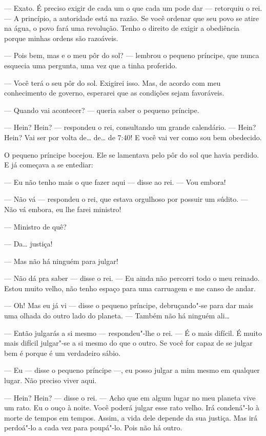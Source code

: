 \begin{Parallel}[p]{}{}
{--- Exato. É preciso exigir de cada um o que cada um pode dar --- retorquiu
o rei. --- A princípio, a autoridade está na razão. Se você ordenar que
seu povo se atire na água, o povo fará uma revolução. Tenho o direito de
exigir a obediência porque minhas ordens são razoáveis.

--- Pois bem, mas e o meu pôr do sol? --- lembrou o pequeno príncipe, que
nunca esquecia uma pergunta, uma vez que a tinha proferido.

--- Você terá o seu pôr do sol. Exigirei isso. Mas, de acordo com meu
conhecimento de governo, esperarei que as condições sejam favoráveis.

--- Quando vai acontecer? --- queria saber o pequeno príncipe.

--- Hein? Hein? --- respondeu o rei, consultando um grande calendário. ---
Hein? Hein? Vai ser por volta de\ldots{} de\ldots{} de 7:40! E você vai ver como
sou bem obedecido.

O pequeno príncipe bocejou. Ele se lamentava pelo pôr do sol que havia
perdido. E já começava a se entediar:

--- Eu não tenho mais o que fazer aqui --- disse ao rei. --- Vou embora!

--- Não vá --- respondeu o rei, que estava orgulhoso por possuir um súdito.
--- Não vá embora, eu lhe farei ministro!

--- Ministro de quê?

--- Da\ldots{} justiça!

--- Mas não há ninguém para julgar!

--- Não dá pra saber --- disse o rei. --- Eu ainda não percorri todo o meu
reinado. Estou muito velho, não tenho espaço para uma carruagem e me
canso de andar.

--- Oh! Mas eu já vi --- disse o pequeno príncipe, debruçando"-se para dar
mais uma olhada do outro lado do planeta. --- Também não há ninguém
ali\ldots{}

--- Então julgarás a si mesmo --- respondeu"-lhe o rei. --- É o mais difícil.
É muito mais difícil julgar"-se a si mesmo do que o outro. Se você for
capaz de se julgar bem é porque é um verdadeiro sábio.

--- Eu --- disse o pequeno príncipe ---, eu posso julgar a mim mesmo em
qualquer lugar. Não preciso viver aqui.

--- Hein? Hein? --- disse o rei. --- Acho que em algum lugar no meu planeta
vive um rato. Eu o ouço à noite. Você poderá julgar esse rato velho. Irá
condená"-lo à morte de tempos em tempos. Assim, a vida dele depende da
sua justiça. Mas irá perdoá"-lo a cada vez para poupá"-lo. Pois não há
outro.

}
\end{Parallel}
